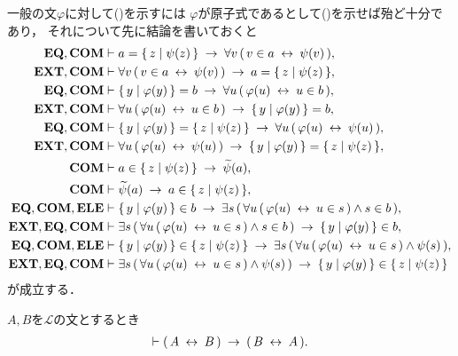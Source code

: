 	一般の文$\varphi$に対して()を示すには
	$\varphi$が原子式であるとして()を示せば殆ど十分であり，
	それについて先に結論を書いておくと
	\begin{align}
		\EQAX,\COMAX &\vdash a = \Set{z}{\psi(z)} 
			\rarrow \forall v\, (\, v \in a \lrarrow \psi(v)\, ), \\
		\EXTAX,\COMAX &\vdash \forall v\, (\, v \in a \lrarrow \psi(v)\, )
			\rarrow a = \Set{z}{\psi(z)}, \\
		\EQAX,\COMAX &\vdash \Set{y}{\varphi(y)} = b 
			\rarrow \forall u\, (\, \varphi(u) \lrarrow u \in b\, ), \\
		\EXTAX,\COMAX &\vdash \forall u\, (\, \varphi(u) \lrarrow u \in b\, )
			\rarrow \Set{y}{\varphi(y)} = b, \\
		\EQAX,\COMAX &\vdash \Set{y}{\varphi(y)} = \Set{z}{\psi(z)}
			\rarrow \forall u\, (\, \varphi(u) \lrarrow \psi(u)\, ), \\
		\EXTAX,\COMAX &\vdash \forall u\, (\, \varphi(u) \lrarrow \psi(u)\, )
			\rarrow \Set{y}{\varphi(y)} = \Set{z}{\psi(z)}, \\
		\COMAX &\vdash a \in \Set{z}{\psi(z)} \rarrow \widetilde{\psi}(a), \\
		\COMAX &\vdash \widetilde{\psi}(a) \rarrow a \in \Set{z}{\psi(z)}, \\
		\EQAX,\COMAX,\ELEAX &\vdash \Set{y}{\varphi(y)} \in b
			\rarrow \exists s\, (\, \forall u\, (\, \varphi(u) \lrarrow u \in s\, ) \wedge s \in b\, ), \\
		\EXTAX,\EQAX,\COMAX &\vdash \exists s\, (\, \forall u\, (\, \varphi(u) \lrarrow u \in s\, ) \wedge s \in b\, ) \rarrow \Set{y}{\varphi(y)} \in b, \\
		\EQAX,\COMAX,\ELEAX &\vdash \Set{y}{\varphi(y)} \in \Set{z}{\psi(z)}
			\rarrow \exists s\, (\, \forall u\, (\, \varphi(u) \lrarrow u \in s\, ) \wedge \psi(s)\, ), \\
		\EXTAX,\EQAX,\COMAX &\vdash \exists s\, (\, \forall u\, (\, \varphi(u) \lrarrow u \in s\, ) \wedge \psi(s)\, ) \rarrow \Set{y}{\varphi(y)} \in \Set{z}{\psi(z)}
	\end{align}
	が成立する．
	
	\begin{screen}
		\begin{logicalthm}[同値記号の対称律]
		\label{logicalthm:symmetry_of_equivalence_arrows}
			$A,B$を$\mathcal{L}$の文とするとき
			\begin{align}
				\vdash (\, A \lrarrow B\, ) \rarrow (\, B \lrarrow A\, ).
			\end{align}
		\end{logicalthm}
	\end{screen}
	
